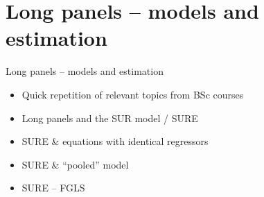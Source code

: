 \documentclass[usenames,dvipsnames]{beamer}
\begin{document}
\section{Long panels -- models and estimation}
\begin{frame}{Long panels -- models and estimation}
    \begin{itemize}
        \item Quick repetition of relevant topics from BSc courses
        \bigskip
        \item Long panels and the SUR model / SURE
        \bigskip
        \item SURE \& equations with identical regressors
        \bigskip
        \item SURE \& ``pooled'' model
        \bigskip
        \item SURE -- FGLS
    \end{itemize}
\end{frame}
\end{document}
